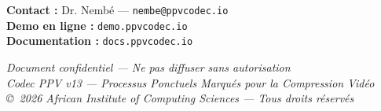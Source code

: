 \documentclass[12pt,a4paper]{article}
\begin{document}
	\vspace{1cm}
	
	\begin{center}
		\textbf{Contact :} Dr. Nembé — \texttt{nembe@ppvcodec.io} \\
		\textbf{Demo en ligne :} \texttt{demo.ppvcodec.io} \\
		\textbf{Documentation :} \texttt{docs.ppvcodec.io}
	\end{center}
	
	\vfill
	
	\begin{center}
		\textit{Document confidentiel — Ne pas diffuser sans autorisation} \\
		\textit{Codec PPV v13 — Processus Ponctuels Marqués pour la Compression Vidéo} \\
		\textit{\copyright~2026 African Institute of Computing Sciences — Tous droits réservés}
	\end{center}
	
\end{document}
